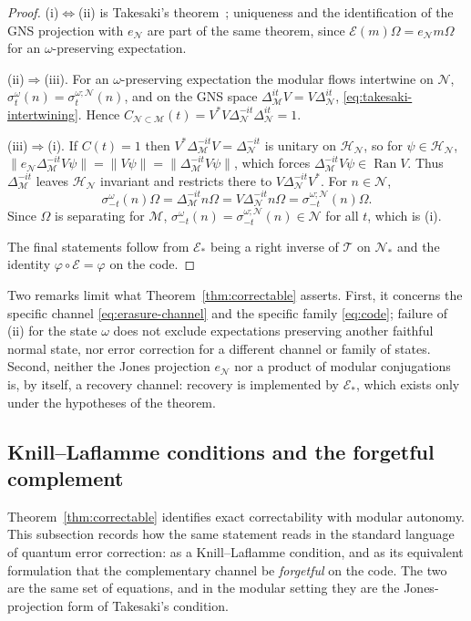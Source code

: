 \documentclass[a4paper,11pt]{article}
\theoremstyle{definition}
\newcommand{\mN}{\mathcal{N}}
\newcommand{\mH}{\mathcal{H}}
\newcommand{\mM}{\mathcal{M}}
\newcommand{\mE}{\mathcal{E}}
\begin{document}
\begin{proof}
(i)$\Leftrightarrow$(ii) is Takesaki's theorem~\cite{Takesaki1972}; uniqueness and the identification of the GNS projection with $e_{\mN}$ are part of the same theorem, since $\mE(m)\Omega=e_{\mN}m\Omega$ for an $\omega$-preserving expectation.

(ii)$\Rightarrow$(iii). For an $\omega$-preserving expectation the modular flows intertwine on $\mN$,
$\sigma^{\omega}_t(n)=\sigma^{\omega;\mN}_t(n)$, and on the GNS space
$\Delta_{\mM}^{it}V=V\Delta_{\mN}^{it}$, \eqref{eq:takesaki-intertwining}. Hence
$C_{\mN\subset\mM}(t)=V^*V\Delta_{\mN}^{-it}\Delta_{\mN}^{it}=1$.

(iii)$\Rightarrow$(i). If $C(t)=1$ then $V^*\Delta_{\mM}^{-it}V=\Delta_{\mN}^{-it}$ is unitary on $\mH_{\mN}$, so for $\psi\in\mH_{\mN}$,
$\|e_{\mN}\Delta_{\mM}^{-it}V\psi\|=\|V\psi\|=\|\Delta_{\mM}^{-it}V\psi\|$,
which forces $\Delta_{\mM}^{-it}V\psi\in\operatorname{Ran}V$. Thus $\Delta_{\mM}^{-it}$ leaves $\mH_{\mN}$ invariant and restricts there to $V\Delta_{\mN}^{-it}V^*$. For $n\in\mN$,
\[
 \sigma^{\omega}_{-t}(n)\Omega=\Delta_{\mM}^{-it}n\Omega
 =V\Delta_{\mN}^{-it}n\Omega=\sigma^{\omega;\mN}_{-t}(n)\Omega .
\]
Since $\Omega$ is separating for $\mM$, $\sigma^{\omega}_{-t}(n)=\sigma^{\omega;\mN}_{-t}(n)\in\mN$ for all $t$, which is (i).

The final statements follow from $\mE_*$ being a right inverse of $\mathcal T$ on $\mN_*$ and the identity $\varphi\circ\mE=\varphi$ on the code.
\end{proof}

Two remarks limit what Theorem~\ref{thm:correctable} asserts. First, it concerns the specific channel \eqref{eq:erasure-channel} and the specific family \eqref{eq:code}; failure of (ii) for the state $\omega$ does not exclude expectations preserving another faithful normal state, nor error correction for a different channel or family of states. Second, neither the Jones projection $e_{\mN}$ nor a product of modular conjugations is, by itself, a recovery channel: recovery is implemented by $\mE_*$, which exists only under the hypotheses of the theorem.



\subsection{Knill--Laflamme conditions and the forgetful complement}\label{subsec:QEC-KL}

Theorem~\ref{thm:correctable} identifies exact correctability with modular autonomy. This subsection records how the same statement reads in the standard language of quantum error correction: as a Knill--Laflamme condition, and as its equivalent formulation that the complementary channel be \emph{forgetful} on the code. The two are the same set of equations, and in the modular setting they are the Jones-projection form of Takesaki's condition.
\end{document}
